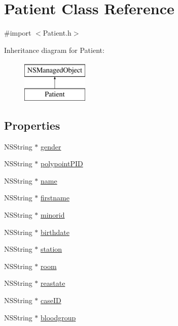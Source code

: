 \hypertarget{interface_patient}{}\section{Patient Class Reference}
\label{interface_patient}


{\ttfamily \#import $<$Patient.\+h$>$}

Inheritance diagram for Patient\+:\begin{figure}[H]
\begin{center}
\leavevmode
\includegraphics[height=2.000000cm]{interface_patient}
\end{center}
\end{figure}
\subsection*{Properties}
\begin{DoxyCompactItemize}
\item 
N\+S\+String $\ast$ \hyperlink{interface_patient_afba1dccbb8d7bbd3c781f29567e25012}{gender}
\item 
N\+S\+String $\ast$ \hyperlink{interface_patient_a051835fb9dc144b2eef8d2abbed24369}{polypoint\+P\+I\+D}
\item 
N\+S\+String $\ast$ \hyperlink{interface_patient_a844da2d098222567d9b708427b0375df}{name}
\item 
N\+S\+String $\ast$ \hyperlink{interface_patient_adf77dd430bf161df938aacf439f90f12}{firstname}
\item 
N\+S\+String $\ast$ \hyperlink{interface_patient_a3bba7b0f02f94ffebea3a020d0035152}{minorid}
\item 
N\+S\+String $\ast$ \hyperlink{interface_patient_a1d33003a43dd91ff01732a40286424a8}{birthdate}
\item 
N\+S\+String $\ast$ \hyperlink{interface_patient_a0fbfb795f61127043a26b5376914ddf5}{station}
\item 
N\+S\+String $\ast$ \hyperlink{interface_patient_abf34f6869c235daf2d5df9d6e11897ec}{room}
\item 
N\+S\+String $\ast$ \hyperlink{interface_patient_ac78b831533474bd62677098f80ae6b1e}{reastate}
\item 
N\+S\+String $\ast$ \hyperlink{interface_patient_a36bebff3d5e746d2ca5e28c256679e8a}{case\+I\+D}
\item 
N\+S\+String $\ast$ \hyperlink{interface_patient_aef7a435cae7b338456ed083a133d6266}{bloodgroup}
\end{DoxyCompactItemize}


